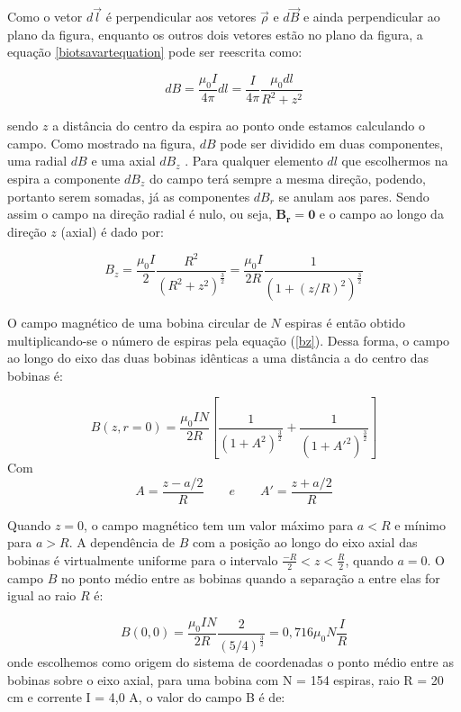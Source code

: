 \documentclass{article}
\begin{document}
Como o vetor $d \vec l$ é perpendicular aos vetores $\vec \rho$ e $d \vec B$ e ainda perpendicular ao plano da figura, enquanto os outros dois vetores estão no plano da figura, a equação \ref{biotsavartequation} pode ser reescrita como:

\begin{equation}
    dB = \frac{\mu _0 I}{4 \pi} dl = \frac{I}{4 \pi} \frac{\mu _0 dl}{R^2 +z^2}
\end{equation}

sendo $z$ a distância do centro da espira ao ponto onde estamos calculando o campo. Como mostrado na figura, $dB$ pode ser dividido em duas componentes, uma radial $dB$ e uma axial $dB _z$ . Para qualquer elemento $dl$ que escolhermos na espira a componente $dB _z$ do campo terá sempre a mesma direção, podendo, portanto serem somadas, já as componentes $dB _r$ se anulam aos pares. Sendo assim o campo na direção radial é nulo, ou seja, $\mathbf{B _r = 0}$ e o campo ao longo da direção $z$ (axial) é dado por:

\begin{equation}
    \label{bz}
    B _z = \frac{\mu _0 I}{2}\frac{R^2}{(R^2 + z^2)^{\frac{3}{2}}} =  \frac{\mu _0 I}{2R}\frac{1}{(1 + (z/R)^2)^{\frac{3}{2}}}
\end{equation}

O campo magnético de uma bobina circular de $N$ espiras é então obtido multiplicando-se o número de espiras pela equação (\ref{bz}). Dessa forma, o campo ao longo do eixo das duas bobinas idênticas a uma distância a do centro das bobinas é:

\begin{equation}
    B(z,r=0) =  \frac{\mu _0 I N}{2R} \left [ \frac{1}{(1 + A^2)^{\frac{3}{2}}} + \frac{1}{(1 + A'^2)^{\frac{3}{2}}} \right ]
\end{equation}
Com
\begin{equation*}
    A = \frac{z-a/2}{R} \qquad e \qquad A' = \frac{z+a/2}{R}     
\end{equation*}

Quando  $z = 0$, o campo magnético tem um valor máximo para $a < R$ e mínimo para $a > R$. A dependência de $B$ com a posição ao longo do eixo axial das bobinas é virtualmente uniforme para o intervalo $\frac{-R}{2} < z < \frac{R}{2}$, quando $a = 0$. O campo $B$ no ponto médio entre as bobinas quando a separação a entre elas for igual ao raio $R$ é:

\begin{equation}
    B(0,0) = \frac{\mu _0 I N }{2R} \frac{2}{(5/4)^{\frac{3}{2}}} = 0,716 \mu _0 N \frac{I}{R}
\end{equation}
onde escolhemos como origem do sistema de coordenadas o ponto médio entre as bobinas sobre o eixo axial, para uma bobina com N = 154 espiras, raio R = 20 cm e corrente I = 4,0 A, o valor do campo B é de:
\end{document}
